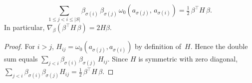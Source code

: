 %
%
%


%
%
%


\begin{notationupdated}
\begin{lemma}\label{lem:H-quadratic}
\[
  \sum_{1 \leq j < i \leq |S|}
    \beta_{\sigma(i)}\, \beta_{\sigma(j)}\,
    \omega_0(a_{\sigma(j)},\, a_{\sigma(i)})
  = \tfrac{1}{2}\, \beta^\top H\, \beta.
\]
In particular,
$\nabla_{\beta}
  (\beta^\top H\, \beta) = 2H \beta$.
\end{lemma}

\begin{proof}
For $i > j$,
$H_{ij} = \omega_0(a_{\sigma(j)}, a_{\sigma(i)})$
by definition of~$H$.
Hence the double sum equals
$\sum_{j < i} \beta_{\sigma(i)}\, \beta_{\sigma(j)}\, H_{ij}$.
Since $H$ is symmetric with zero diagonal,
$\sum_{j < i} \beta_{\sigma(i)} \beta_{\sigma(j)} H_{ij}
= \tfrac{1}{2}\, \beta^\top H\, \beta$.
\end{proof}
\end{notationupdated}


